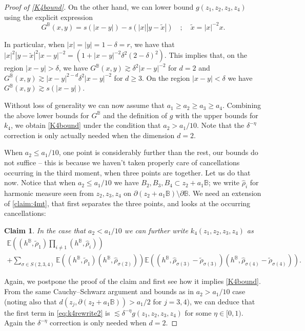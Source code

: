 \documentclass[JEP,XML,SOM,Unicode,published]{cedram}
\newtheorem{claim}[theorem]{Claim}
\theoremstyle{definition}
\newcommand{\E}{\mathbb{E}}
\newcommand{\B}{\mathbb{B}}\let\D\B\let\Ub\B
\begin{document}
\begin{proof}[Proof of \eqref{K4bound}]
On the other hand, we can lower bound $g(z_1,z_2,z_3,z_4)$ using the explicit expression
\[
G^\B(x,y)=s(|x-y|)-s(|x||y-\tilde{x}|) \quad ; \quad \tilde{x}=|x|^{-2}x.
\]

In particular, when $|x|=|y|=1-\delta=r$, we have that $|x|^2|y-\tilde{x}|^2|x-y|^{-2}=(1+|x-y|^{-2}\delta^2(2-\delta)^2)$. This implies that, on the region $|x-y|>\delta$, we have $ G^\B(x,y)\gtrsim \delta^2|x-y|^{-2}$ for $d=2$ and $G^\B(x,y) \gtrsim |x-y|^{2-d}\delta^2|x-y|^{-2}$ for $d\ge 3$. On the region $|x-y|<\delta$ we have $G^\B(x,y)\gtrsim s(|x-y|)$.

Without loss of generality we can now assume that $a_1\ge a_2\ge a_3\ge a_4$.
Combining the above lower bounds for $G^\B$ and the definition of $g$ with the upper bounds for $k_4$, we obtain \eqref{K4bound} under the condition that $a_2>a_1/10$. Note that the $\delta^{-\eta}$ correction is only actually needed when the dimension $d=2$.

When $a_2 \leq a_1/10$, \ie one point is considerably further than the rest, our bounds do not suffice -- this is because we haven't taken properly care of cancellations occurring in the {third moment, when three points are together}. Let us do that now.
Notice that when $a_2 \leq a_1/10$ we have $B_2,B_3,B_4\subset z_2+a_1\B$; we write $\hat\rho_i$ for harmonic measure seen from $z_2,z_3,z_4$ on $\partial(z_2+a_1\B)\setminus \partial\B$. We need an extension of \cref{claim:4mt}, that first separates the three points, and looks at the occurring cancellations:

\begin{claim}
In the case that $a_2<a_1/10$ we can further write $k_4(z_1,z_2,z_3,z_4)$ as\vspace*{-3pt}
\begin{multline}\label{eq:k4rewrite2}\E((h^\B,\tilde{\rho}_1)\prod_{i\ne 1} (h^\B,\hat\rho_i))\\[-3pt]
+\sum_{\sigma\in S({2,3,4})} \E((h^\B,\tilde{\rho}_1)(h^\B,\hat\rho_{\sigma(2)}))\E((h^\B,\hat\rho_{\sigma(3)}-\tilde{\rho}_{\sigma(3)})(h^\B,\hat\rho_{\sigma(4)}-\tilde{\rho}_{\sigma(4)})).\end{multline}
\end{claim}

Again, we postpone the proof of the claim and first see how it implies \eqref{K4bound}.
From the same Cauchy--Schwarz argument and bounds as in $a_2>a_1/10$ case (noting also that $d(z_j,\partial (z_2+a_1\B))>a_1/2$ for $j=3,4$), we can deduce that the first term in \eqref{eq:k4rewrite2} is $\lesssim \delta^{-\eta} g(z_1,z_2,z_3,z_4)$ for some $\eta\in [0,1)$. Again the $\delta^{-\eta}$ correction is only needed when $d=2$.


\end{proof}
\end{document}
